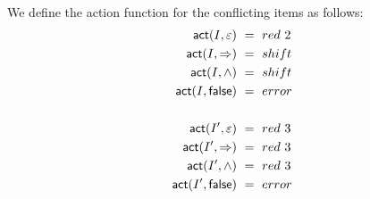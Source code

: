 \begin{solution}
\begin{enumerate}[(a)]
\begin{align*}
%
\end{align*}
	   	We define the action function for the conflicting items as follows:
	   	\begin{align*}
	   	    \textsf{act} (I,\varepsilon) ~{}={}~& red~2 \\
	   	    \textsf{act} (I,\Rightarrow) ~{}={}~& shift \\
	   	    \textsf{act} (I,\wedge) ~{}={}~& shift \\
	   	    \textsf{act} (I,\textsf{false}) ~{}={}~& error \\
	   	    \\
	   	    \textsf{act} (I',\varepsilon) ~{}={}~& red~3 \\
	   	    \textsf{act} (I',\Rightarrow) ~{}={}~& red~3 \\
	   	    \textsf{act} (I',\wedge) ~{}={}~& red~3 \\
	   	    \textsf{act} (I',\textsf{false}) ~{}={}~& error 
	   	\end{align*}
\end{enumerate}
%
\end{solution}
